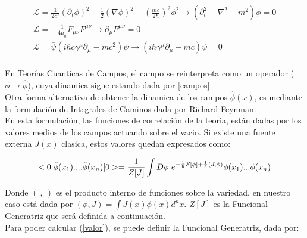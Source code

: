\begin{equation}
\begin{array}{c}
\mathscr{L} = \frac{1}{2 c^2} (\partial _t \phi ) ^2 - \frac{1}{2} (  \nabla \phi ) ^2 - 
	\left( \frac{m c}{2 \hbar}  \right) ^2 \phi ^2 
\rightarrow 
\left(
	\partial _t ^2 - \nabla ^2 + m^2 
		\right) \phi = 0 \\[8pt]
		
\mathscr{L} = - \frac{1}{4 \mu _0} F _{\mu \nu} F ^{\mu \nu}
\rightarrow \partial _{\mu} F ^{\mu \nu} = 0 \\[8pt]

\mathscr{L} =  { \bar{\psi} } \left(
			i \hbar c \gamma ^{\mu} \partial _{\mu} - m c^2 
			\right) \psi 
\rightarrow
			\left( i \hbar  \gamma ^{\mu} \partial _{\mu}  - m c  \right)\psi = 0\\[10pt]
\end{array}
\label{campos}
\end{equation}




En Teorías Cuantícas de Campos, el campo se reinterpreta como un operador ($\phi \rightarrow \hat{\phi}$), cuya dinamica sigue  estando dada por \ref{campos}. \\




Otra forma alternativa de obtener la dinamica de los campos $\hat{\phi } (x)$, es mediante la formulación de Integrales de Caminos dada por Richard Feynman.\\

En esta formulación, las funciones de correlación de la teoria, están dadas por los valores medios de los campos actuando sobre el vacio. Si existe una fuente externa $J(x)$ clasica, estos valores quedan expresados como:

\begin{equation}
< 0 | \hat{ \phi  } (x _1) .... \hat{\phi  } (x _n) | 0 > = \frac{1}{Z[J]} 
\int  D
\phi \ e ^{- \frac{1}{\hbar} S[ \phi ] + \frac{1}{\hbar} (J, \phi )} \phi (x _1) ... \phi (x _n) \\[10pt]
\label{valor}
\end{equation}

Donde $( \  , \ ) $ es el producto interno de funciones sobre la variedad, en nuestro caso está dada por $(\phi,J) = \int J(x) \phi (x) d^n x$.  $Z[J]$ es la Funcional Generatriz que será definida a continuación.\\




Para poder calcular (\ref{valor}), se puede definir la Funcional Generatriz, dada por:


